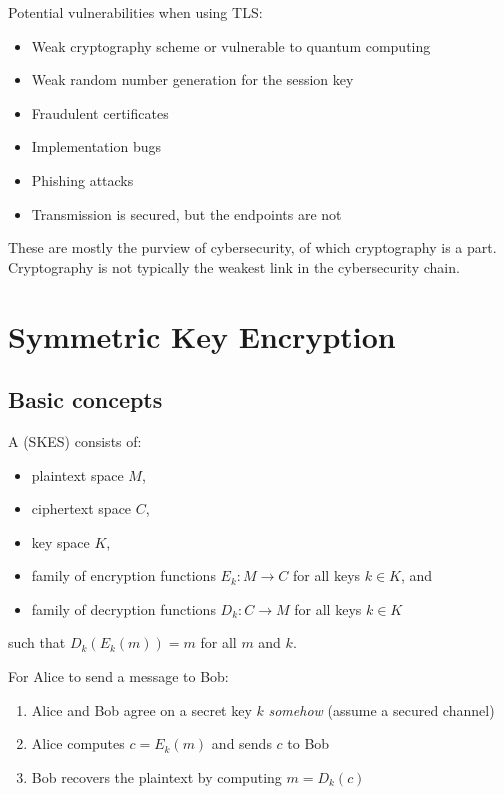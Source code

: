 \documentclass[class=co487,tikz,notes]{agony}
\begin{document}
Potential vulnerabilities when using TLS:
\begin{itemize}
  \item Weak cryptography scheme or vulnerable to quantum computing
  \item Weak random number generation for the session key
  \item Fraudulent certificates
  \item Implementation bugs
  \item Phishing attacks
  \item Transmission is secured, but the endpoints are not
\end{itemize}
These are mostly the purview of cybersecurity,
of which cryptography is a part.
Cryptography is not typically the weakest link in the cybersecurity chain.

\chapter{Symmetric Key Encryption}

\section{Basic concepts}

\begin{defn}
  A  (SKES) consists of:
  \begin{itemize}[nosep]
    \item plaintext space $M$,
    \item ciphertext space $C$,
    \item key space $K$,
    \item family of encryption functions $E_k : M \to C$ for all keys $k \in K$, and
    \item family of decryption functions $D_k : C \to M$ for all keys $k \in K$
  \end{itemize}
  such that $D_k(E_k(m)) = m$ for all $m$ and $k$.
\end{defn}

For Alice to send a message to Bob:
\begin{enumerate}[1.,nosep]
  \item Alice and Bob agree on a secret key $k$ \emph{somehow} (assume a secured channel)
  \item Alice computes $c = E_k(m)$ and sends $c$ to Bob
  \item Bob recovers the plaintext by computing $m = D_k(c)$
\end{enumerate}
\end{document}
